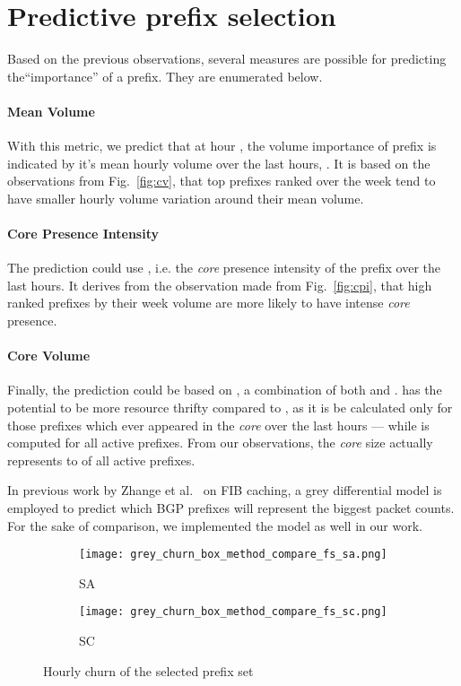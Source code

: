 \documentclass[10pt, conference,letterpaper]{IEEEtran}
\begin{document}
\section{Predictive prefix selection}
\label{sec:sele}
Based on the previous observations, several measures are possible for predicting the``importance'' of a prefix. They are enumerated below. 
\paragraph*{Mean Volume}
With this metric, we predict that at hour , the volume importance of prefix  is indicated by it's mean hourly volume over the last  hours, .
It is based on the observations from Fig.~\ref{fig:cv}, that top prefixes ranked over the week tend to have smaller hourly volume variation around their mean volume.
\paragraph*{Core Presence Intensity}
The prediction could use , i.e. the \textit{core} presence intensity of the prefix over the last  hours. It derives from the observation made from Fig.~\ref{fig:cpi}, that high ranked prefixes by their week volume are more likely to have intense \textit{core} presence.

\paragraph*{Core Volume}
Finally, the prediction could be based on ,  a combination of both  and .
 has the potential to be more resource thrifty compared to , as it is be calculated only for those prefixes which ever appeared in the \textit{core} over the last  hours --- while  is computed for all active prefixes. From our observations, the \textit{core} size actually represents  to  of all active prefixes.

In previous work by Zhange et al.\ \cite{Zhang2012} on FIB caching, a grey differential model  \cite{Julong1989} is employed to  predict which BGP prefixes will represent the  biggest packet counts. For the sake of comparison, we implemented the  model as well in our work. 






\begin{figure*}[!tb]
\centering
		\centering
        \begin{subfigure}[b]{0.49\textwidth}
        \centering
                \texttt{[image: grey\_churn\_box\_method\_compare\_fs\_sa.png]}
                \caption{SA}
                \label{fig:churn_sa}
        \end{subfigure}
        \hfill
        \begin{subfigure}[b]{0.49\textwidth}
        \centering
                \texttt{[image: grey\_churn\_box\_method\_compare\_fs\_sc.png]}
                \caption{SC}
                \label{fig:churn_sc}
        \end{subfigure}
\caption{Hourly churn of the selected prefix set}
\label{fig:churn}
\end{figure*}
\end{document}
